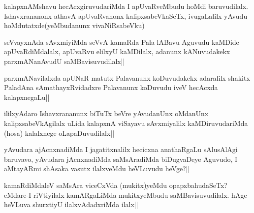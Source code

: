\begin{artha}
kalapxnAMshavu hecAcxgiruvudariMda I apUvaRveMbudu hoMdi baruvudilalx. Ishavxrananonx athavA apUvaRvanonx kalipxsabeVkaSeTx, ivugaLalilx yAvudu hoMdutatxde(yeMbudanunx vivaNiRsabeVku)
\end{artha}


\begin{artha}
seVvayxnAda sAvxmiyiMda seVvA kamaRda Pala lABavu Aguvudu kaMDide apUvaRdiMdalalx, apUvaRvu elilxyU kaMDilalx, adanunx kANuvudakekx parxmANanAvudU saMBavisuvudilalx||
\end{artha}

\begin{artha}%
parxmANavilalxda apUNaR matutx Palavanunx koDuvudakekx adaralilx shakitx PaladAna sAmathayxRvidadxre Palavanunx koDuvudu iveV hecAcxda kalapxnegaLu||
\end{artha}

\begin{artha}
ililxyAdaro Ishavxrananunx biTuTx beVre yAvudanUnx oMdanUnx kalipxsabeVkAgilalx uLida kalapxnA viSayavu sAvxmiyalilx kaMDiruvudariMda (hosa) kalalxnege oLapaDuvudilalx||
\end{artha}

\begin{artha}
yAvudara ajAcnxnadiMda I jagatitxnalilx hecicxna anathaRgaLu sAlusAlAgi baruvavo, yAvudara jAcnxnadiMda saMsAradiMda biDugvaDeye Aguvudo, I aMtayARmi shAsaka vasutx ilalxveMdu heVLuvudu heVge?||
\end{artha}


\begin{artha}
kamaRdiMdaleV saMsAra viceCxVda (mukitx)yeMdu opapxbahudaSeTx? eMdare-I riVtiyilalx kamARgaLiMda mukitxyeMbudu saMBavisuvudilalx. hAge heVLuva shurxtiyU ilalxvAdadxriMda ilalx||
\end{artha}

\begin{artha}%

\end{artha}
